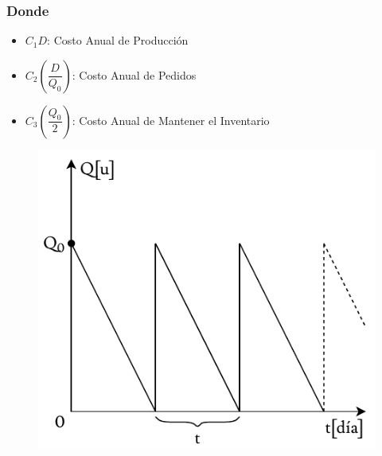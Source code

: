 \documentclass[10pt,letterpaper]{article}
\begin{document}
\subsubsection*{Donde}
\begin{itemize}
\item $C_1 D$: Costo Anual de Producción
\item $C_2 \left( \dfrac{D}{Q_0} \right)$: Costo Anual de Pedidos
\item $C_3 \left( \dfrac{Q_0}{2} \right)$: Costo Anual de Mantener el Inventario
\end{itemize}
\vspace{0.1cm}
\begin{figure}[H]
\centering
\includegraphics[scale=0.8]{EOQ.pdf}
\end{figure}
\end{document}
